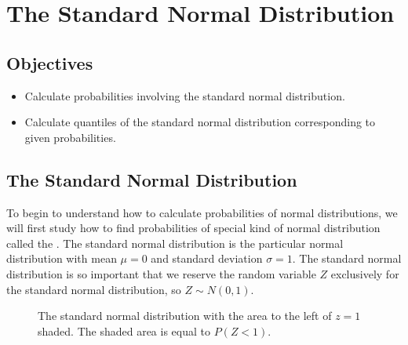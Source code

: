 \documentclass[letterpaper,10pt,english]{jupyterBook}
\begin{document}
\section{The Standard Normal Distribution}
\label{\detokenize{Ch4 The Normal Distribution and the Central Limit Theorem/4.2 The Standard Normal Distribution:the-standard-normal-distribution}}\label{\detokenize{Ch4 The Normal Distribution and the Central Limit Theorem/4.2 The Standard Normal Distribution::doc}}

\subsection{Objectives}
\label{\detokenize{Ch4 The Normal Distribution and the Central Limit Theorem/4.2 The Standard Normal Distribution:objectives}}\begin{itemize}
\item {} 
\sphinxAtStartPar
Calculate probabilities involving the standard normal distribution.

\item {} 
\sphinxAtStartPar
Calculate quantiles of the standard normal distribution corresponding to given probabilities.

\end{itemize}


\subsection{The Standard Normal Distribution}
\label{\detokenize{Ch4 The Normal Distribution and the Central Limit Theorem/4.2 The Standard Normal Distribution:id1}}
\sphinxAtStartPar
To begin to understand how to calculate probabilities of normal distributions, we will first study how to find probabilities of special kind of normal distribution called the . The standard normal distribution is the particular normal distribution with mean \(\mu = 0\) and standard deviation \(\sigma = 1\). The standard normal distribution is so important that we reserve the random variable \(Z\) exclusively for the standard normal distribution, so \(Z \sim N(0, 1)\).

\begin{figure}[htbp]
\centering
\capstart

\noindent{}
\caption{The standard normal distribution with the area to the left of \(z = 1\) shaded. The shaded area is equal to \(P(Z < 1)\).}\label{\detokenize{Ch4 The Normal Distribution and the Central Limit Theorem/4.2 The Standard Normal Distribution:stdnormal1}}\end{figure}
\end{document}
